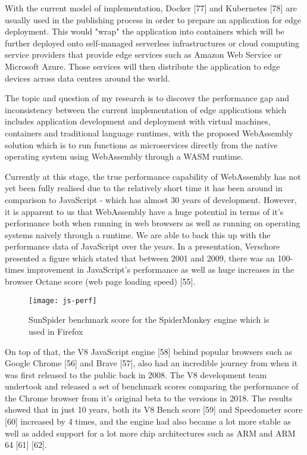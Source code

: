 With the current model of implementation, Docker [77] and Kubernetes [78] are usually used in the publishing process in order to prepare an application for edge deployment. This would "wrap" the application into containers which will be further deployed onto self-managed serverless infrastructures or cloud computing service providers that provide edge services such as Amazon Web Service or Microsoft Azure. Those services will then distribute the application to edge devices across data centres around the world.

The topic and question of my research is to discover the performance gap and inconsistency between the current implementation of edge applications which includes application development and deployment with virtual machines, containers and traditional language runtimes, with the proposed WebAssembly solution which is to run functions as microservices directly from the native operating system using WebAssembly through a WASM runtime.

Currently at this stage, the true performance capability of WebAssembly has not yet been fully realised due to the relatively short time it has been around in comparison to JavaScript - which has almost 30 years of development. However, it is apparent to us that WebAssembly have a huge potential in terms of it's performance both when running in web browsers as well as running on operating systems naively through a runtime. We are able to back this up with the performance data of JavaScript over the years. In a presentation, Verschore presented a figure which stated that between 2001 and 2009, there was an 100-times improvement in JavaScript's performance as well as huge increases in the browser Octane score (web page loading speed) [55].

\newpage
\begin{figure}[!ht]
\centering
\texttt{[image: js-perf]}
\caption{\footnotesize{SunSpider benchmark score for the SpiderMonkey engine which is used in Firefox}}
\captionsetup{aboveskip=0pt,font=it}
\end{figure}

On top of that, the V8 JavaScript engine [58] behind popular browsers such as Google Chrome [56] and Brave [57], also had an incredible journey from when it was first released to the public back in 2008. The V8 development team undertook and released a set of benchmark scores comparing the performance of the Chrome browser from it's original beta to the versions in 2018. The results showed that in just 10 years, both its V8 Bench score [59] and Speedometer score [60] increased by 4 times, and the engine had also became a lot more stable as well as added support for a lot more chip architectures such as ARM and ARM 64 [61] [62].

